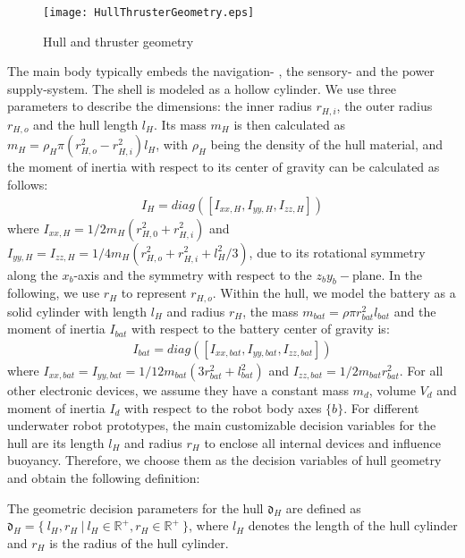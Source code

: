 \begin{figure}[htb]
      \centering
      \texttt{[image: HullThrusterGeometry.eps]}
      \caption{Hull and thruster geometry}
      \label{FIG:HullThrusterGeometry}
\end{figure}
The main body typically embeds the navigation- , the sensory-  and the power supply-system. The shell is modeled as a hollow cylinder. We use three parameters to describe the dimensions: the inner radius $r_{H,i}$, the outer radius $r_{H,o}$ and the hull length $l_{H}$. Its mass $m_{H}$ is then calculated as $m_{H}=\rho_{H}\pi(r_{H,o}^{2}-r_{H,i}^{2})l_{H}$, with $\rho_{H}$ being the density of the hull material, and the moment of inertia with respect to its center of gravity can be calculated as follows:
\begin{align*}
I_{H}=diag([I_{xx,H}, I_{yy,H}, I_{zz,H}])
\end{align*}
where $I_{xx,H}=1/2m_{H}(r_{H,0}^{2}+r_{H,i}^{2})$ and $I_{yy,H}=I_{zz,H}=1/4m_{H}(r_{H,o}^{2}+r_{H,i}^{2}+l_{H}^{2}/3)$, due to its rotational symmetry along the $x_b$-axis and the symmetry with respect to the $z_{b}y_{b}-$plane. In the following, we use $r_{H}$ to represent $r_{H,o}$. Within the hull, we model the battery as a solid cylinder with length $l_{H}$ and radius $r_{H}$, the mass $m_{bat}=\rho \pi r_{bat}^{2}l_{bat}$ and the moment of inertia $I_{bat}$ with respect to the battery center of gravity is: 
\begin{align*}
I_{bat}=diag([I_{xx,bat}, I_{yy,bat}, I_{zz,bat}])
\end{align*}
where $I_{xx,bat}=I_{yy,bat}=1/12m_{bat}(3r_{bat}^{2}+l_{bat}^{2})$ and $I_{zz,bat}=1/2m_{bat}r_{bat}^{2}$.
For all other electronic devices, we assume they have a constant mass $m_{d}$, volume $V_{d}$ and moment of inertia $I_{d}$ with respect to the robot body axes $\lbrace b \rbrace$.
For different underwater robot prototypes, the main customizable decision variables for the hull are its length $l_{H}$ and radius $r_{H}$ to enclose all internal devices and influence buoyancy. Therefore, we choose them as the decision variables of hull geometry and obtain the following definition:
\begin{definition}
The geometric decision parameters for the hull $\mathfrak{d}_{H}$ are defined as $\mathfrak{d}_{H}=\lbrace~l_{H}, r_{H}~|~l_{H}\in \mathbb{R}^{+}, r_{H} \in \mathbb{R}^{+}~\rbrace$, where $l_{H}$ denotes the length of the hull cylinder and $r_{H}$ is the radius of the hull cylinder.
\end{definition}
